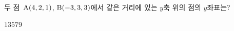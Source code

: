 두 점~$\mathrm{A}(4{,}\mkern3mu\mathopen{}2{,}\mkern3mu\mathopen{}1)$, $\mathrm{B}(-3{,}\mkern3mu\mathopen{}3{,}\mkern3mu\mathopen{}3)$에서 같은 거리에 있는 $y$축 위의 점의 $y$좌표는?
\begin{choices32}{$1$}{$3$}{$5$}{$7$}{$9$}\end{choices32}
